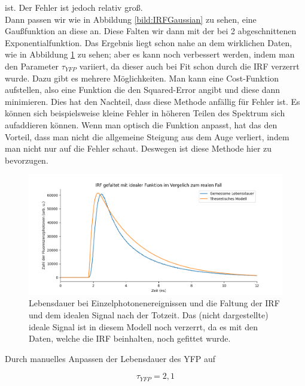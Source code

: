 ist. Der Fehler ist jedoch relativ groß. \\
Dann passen wir wie in Abbildung \ref{bild:IRFGaussian} zu sehen, eine Gaußfunktion an diese an. Diese Falten wir dann mit der bei 2 
abgeschnittenen Exponentialfunktion. Das Ergebnis liegt schon nahe an dem wirklichen Daten, wie in Abbildung \ref{bild:IRFconvGauss} zu sehen; aber es kann noch verbessert werden, indem man den Parameter $\tau_{YFP}$ variiert, da dieser auch bei Fit schon 
durch die IRF verzerrt wurde. Dazu gibt es mehrere Möglichkeiten. Man kann eine Cost-Funktion aufstellen, also eine Funktion die den Squared-Error angibt und diese 
dann minimieren. Dies hat den Nachteil, dass diese Methode anfällig für Fehler ist. Es können sich beispielsweise kleine Fehler in höheren 
Teilen des Spektrum sich aufaddieren können. Wenn man optisch die Funktion anpasst, hat das den Vorteil, dass man nicht die allgemeine Steigung aus dem Auge 
verliert, indem man nicht nur auf die Fehler schaut. Deswegen ist diese Methode hier zu bevorzugen.\\

\begin{figure}[h]
    \centering
    \includegraphics[width = \linewidth]{Bilder/Auswertung/IRFGaussianConvol.png}
    \caption{Lebensdauer bei Einzelphotonenereignissen und die Faltung der IRF und dem idealen Signal nach der Totzeit. Das (nicht dargestellte) ideale Signal ist in diesem 
    Modell noch verzerrt, da es mit den Daten, welche die IRF beinhalten, noch gefittet wurde.}
    \label{bild:IRFconvGauss}
\end{figure}

Durch manuelles Anpassen der Lebensdauer des YFP auf 

\begin{equation*}
    \tau_{YFP} = 2,1
\end{equation*}

